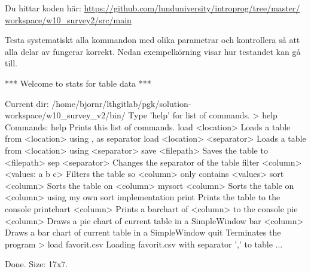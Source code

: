 \noindent Du hittar koden här:
\href{https://github.com/lunduniversity/introprog/tree/master/workspace/w10_survey2/src/main}{https://github.com/lunduniversity/introprog/tree/master/\\workspace/w10\_survey2/src/main}




\Task Testa systematiskt alla kommandon med olika parametrar och kontrollera så att alla delar av  fungerar korrekt. Nedan exempelkörning visar hur testandet kan gå till.

\begin{REPLnonum}
*** Welcome to stats for table data ***

Current dir: /home/bjornr/lthgitlab/pgk/solution-workspace/w10_survey_v2/bin/
Type 'help' for list of commands.
> help
Commands: help
             Prints this list of commands.
          load <location>
             Loads a table from <location> using , as separator
          load <location> <separator>
             Loads a table from <location> using <separator>
          save <filepath>
             Saves the table to <filepath>
          sep <separator>
             Changes the separator of the table
          filter <column> <values: a b c>
             Filters the table so <column> only contains <values>
          sort <column>
             Sorts the table on <column>
          mysort <column>
             Sorts the table on <column> using my own sort implementation
          print
             Prints the table to the console
          printchart <column>
             Prints a barchart of <column> to the console
          pie <column>
             Draws a pie chart of current table in a SimpleWindow
          bar <column>
             Draws a bar chart of current table in a SimpleWindow
          quit
             Terminates the program
> load favorit.csv
Loading favorit.csv with separator ',' to table ...

Done. Size: 17x7.


\end{REPLnonum}
